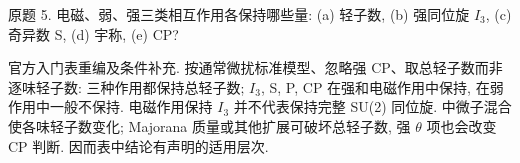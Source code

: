 \begin{exercise}\label{ex:8701-1-5}
原题 5. 电磁、弱、强三类相互作用各保持哪些量: (a) 轻子数, (b) 强同位旋 $I_3$, (c) 奇异数 S, (d) 宇称, (e) CP?
\end{exercise}
\begin{solution}
官方入门表重编及条件补充. 按通常微扰标准模型、忽略强 CP、取总轻子数而非逐味轻子数: 三种作用都保持总轻子数; $I_3$, S, P, CP 在强和电磁作用中保持, 在弱作用中一般不保持. 电磁作用保持 $I_3$ 并不代表保持完整 SU(2) 同位旋. 中微子混合使各味轻子数变化; Majorana 质量或其他扩展可破坏总轻子数, 强 $\theta$ 项也会改变 CP 判断. 因而表中结论有声明的适用层次.
\end{solution}
